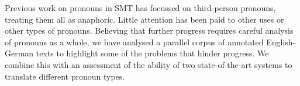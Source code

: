 Previous work on pronouns in SMT has focussed on third-person pronouns, treating them all as anaphoric. Little attention has been paid to other uses or other types of pronouns. Believing that further progress requires careful analysis of pronouns as a whole, we have analysed a parallel corpus of annotated English-German texts to highlight some of the problems that hinder progress. We combine this with an assessment of the ability of two state-of-the-art systems to translate different pronoun types.
